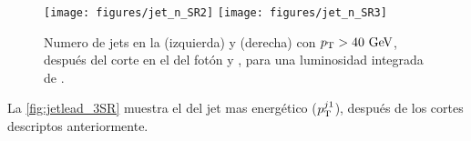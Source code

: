\begin{figure}[th!]
  \centering
  \texttt{[image: figures/jet\_n\_SR2]}
  \texttt{[image: figures/jet\_n\_SR3]}
  \caption{Numero de jets en la {\SRL} (izquierda) y {\SRH} (derecha) con $\pt > 40 \gev$,
    después del corte en el {\pt} del fotón y {\met}, para una luminosidad integrada de {\ilumi}.}
  \label{fig:Njet_3SR}
\end{figure}


La {\fig} \ref{fig:jetlead_3SR} muestra el {\pt} del jet mas energético ($p_{\mathrm{T}}^{j1}$),
después de los cortes descriptos anteriormente. %


